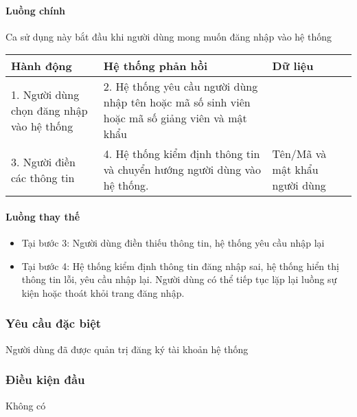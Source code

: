 \documentclass[./../main_file.tex]{subfiles}
\begin{document}
		\paragraph{Luồng chính}
		
		Ca sử dụng này bắt đầu khi người dùng mong muốn đăng nhập vào hệ thống
		\begin{table}[H]
			\begin{tabular}{|p{.33\textwidth}|p{}|p{}|}

				\hline
				\textbf{Hành động}                        & \textbf{Hệ thống phản hồi}                                                                    & \textbf{Dữ liệu}              
				\\ \hline
				1. Người dùng chọn đăng nhập vào hệ thống & 2. Hệ thống yêu cầu người dùng nhập tên hoặc mã số sinh viên hoặc mã số giảng viên và mật khẩu &                               
				\\ \hline
				3. Người điền các thông tin               & 4. Hệ thống kiểm định thông tin và chuyển hướng người dùng vào hệ thống.                      & Tên/Mã và mật khẩu người dùng 
				\\ \hline
				
			\end{tabular}
		\end{table}
		\paragraph{Luồng thay thế}
		\begin{itemize}
			\item Tại bước 3: Người dùng điền thiếu thông tin, hệ thống yêu cầu nhập lại
			\item Tại bước 4:  Hệ thống kiểm định thông tin đăng nhập sai, hệ thống hiển thị thông tin lỗi, yêu cầu nhập lại. Người dùng có thể tiếp tục lặp lại luồng sự kiện hoặc thoát khỏi trang đăng nhập.
			
		\end{itemize}
	\subsubsection{Yêu cầu đặc biệt}
	Người dùng đã được quản trị đăng ký tài khoản hệ thống
	
	\subsubsection{Điều kiện đầu}
	Không có
	
\end{document}
